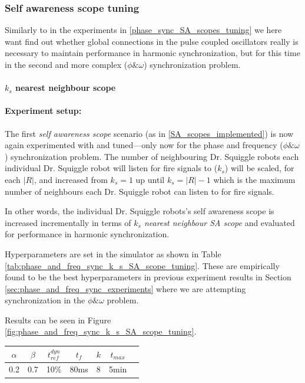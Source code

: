 		\subsubsection{Self awareness scope tuning}
		\label{phase_and_freq_sync_SA_scopes_tuning}
		
		Similarly to in the experiments in \ref{phase_sync_SA_scopes_tuning} we here want find out whether global connections in the pulse coupled oscillators really is necessary to maintain performance in harmonic synchronization, but for this time in the second and more complex ($\phi \& \omega$) synchronization problem.
		
			\paragraph{$k_s$ nearest neighbour scope\nl}
			
				\paragraph{Experiment setup:\nl}
			
				The first \textit{self awareness scope} scenario (as in \ref{SA_scopes_implemented}) is now again experimented with and tuned—only now for the phase and frequency ($\phi \& \omega$) synchronization problem. The number of neighbouring Dr. Squiggle robots each individual Dr. Squiggle robot will listen for fire signals to ($k_s$) will be scaled, for each $|R|$, and increased from $k_s=1$ up until $k_s=|R|-1$ which is the maximum number of neighbours each Dr. Squiggle robot can listen to for fire signals.
				
				In other words, the individual Dr. Squiggle robots's self awareness scope is increased incrementally in terms of \textit{$k_s$ nearest neighbour SA scope} and evaluated for performance in harmonic synchronization.

				Hyperparameters are set in the simulator as shown in Table \ref{tab:phase_and_freq_sync_k_s_SA_scope_tuning}. These are empirically found to be the best hyperparameters in previous experiment results in Section \ref{sec:phase_and_freq_sync_experiments} where we are attempting synchronization in the $\phi \& \omega$ problem.
				
				Results can be seen in Figure \ref{fig:phase_and_freq_sync_k_s_SA_scope_tuning}.

				\begin{center}
				\begin{tabular}{ |c|c|c|c|c|c|c| } 
				\hline
				$\alpha$ & $\beta$ & $t_{ref}^{dyn}$ & $t_f$ & $k$ & $t_{max}$ \\
				\hline
				0.2 & 0.7 & 10\% & 80ms & 8 & 5min \\
				\hline
				\end{tabular}
				\label{tab:phase_and_freq_sync_k_s_SA_scope_tuning}
				\end{center}

